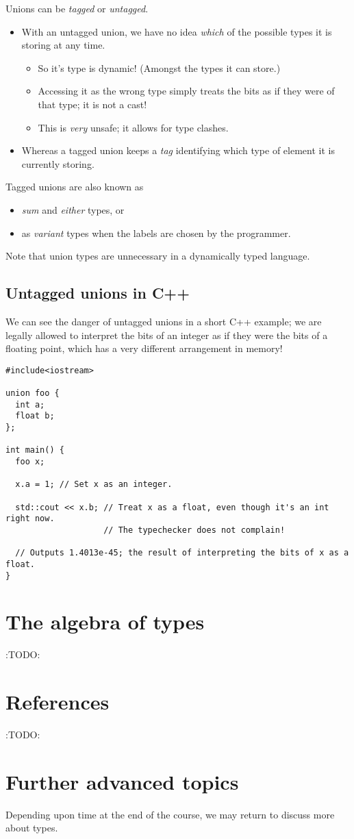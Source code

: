 \documentclass[11pt]{article}
\theoremstyle{definition}
\begin{document}
Unions can be \emph{tagged} or \emph{untagged}.
\begin{itemize}
\item With an untagged union, we have no idea \emph{which} of the possible
types it is storing at any time.
\begin{itemize}
\item So it's type is dynamic! (Amongst the types it can store.)
\item Accessing it as the wrong type simply treats the bits
as if they were of that type; it is not a cast!
\item This is \emph{very} unsafe; it allows for type clashes.
\end{itemize}
\item Whereas a tagged union keeps a \emph{tag} identifying which type
of element it is currently storing.
\end{itemize}

Tagged unions are also known as
\begin{itemize}
\item \emph{sum} and \emph{either} types, or
\item as \emph{variant} types when the labels are chosen by the programmer.
\end{itemize}

Note that union types are unnecessary in a dynamically typed language.

\subsection{Untagged unions in C++}
\label{sec:org778662b}

We can see the danger of untagged unions in a short C++ example;
we are legally allowed to interpret the bits of an integer
as if they were the bits of a floating point,
which has a very different arrangement in memory!
\begin{verbatim}
#include<iostream>

union foo {
  int a;
  float b;
};

int main() {
  foo x;

  x.a = 1; // Set x as an integer.
  
  std::cout << x.b; // Treat x as a float, even though it's an int right now.
                    // The typechecker does not complain!
  
  // Outputs 1.4013e-45; the result of interpreting the bits of x as a float.
}
\end{verbatim}

\section{The algebra of types}
\label{sec:org20929e9}

:TODO:

\section{References}
\label{sec:org84cb0c5}

:TODO:

\section{Further advanced topics}
\label{sec:org5eef00a}

Depending upon time at the end of the course,
we may return to discuss more about types.
\end{document}
